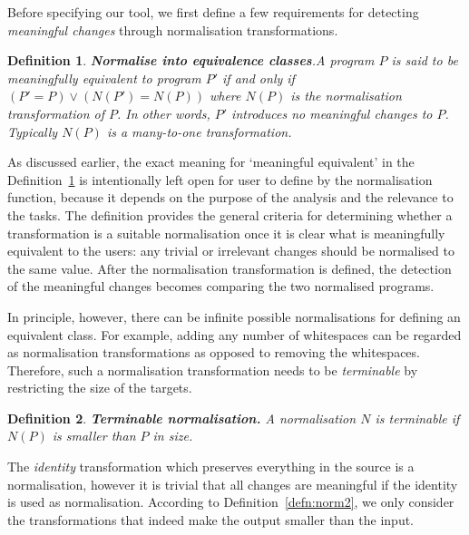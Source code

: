 \documentclass[10pt, conference, compsocconf]{IEEEtran}
\newtheorem{definition}{Definition}
\begin{document}
Before specifying our tool, we first define a few requirements for detecting {\em meaningful changes} through normalisation transformations.
\begin{definition}
{\bf Normalise into equivalence classes}.\label{defn:norm} A program $P$ is said to be {\em meaningfully equivalent} to program $P'$ if and only if $(P'=P) \vee (N(P') = N(P))$ where $N(P)$ is the normalisation transformation of $P$. In other words, $P'$ introduces no meaningful changes to $P$. Typically $N(P)$ is a many-to-one transformation.
\end{definition}

As discussed earlier, the exact meaning for `meaningful equivalent' in  the Definition~\ref{defn:norm} is intentionally left open for user to define by the normalisation function, because it depends on the purpose of the analysis and the relevance to the tasks. The definition provides the general criteria for determining whether a transformation is a suitable normalisation once it is clear what is meaningfully equivalent to the users: any trivial or irrelevant changes should be normalised to the same value. After the normalisation transformation is defined, the detection of the meaningful changes becomes comparing the two normalised programs. 

In principle, however, there can be infinite possible normalisations for defining an equivalent class. For example, adding any number of whitespaces can be regarded as normalisation transformations as opposed to removing the whitespaces. 
Therefore, such a normalisation transformation needs to be {\em terminable} by restricting the size of the targets.
\begin{definition}
{\bf Terminable normalisation.\label{defn:norm2}} A normalisation $N$ is {\em terminable} if $N(P)$ is smaller than $P$ in size.
\end{definition}
The {\em identity} transformation which preserves everything in the source is a normalisation, however it is trivial that all changes are meaningful if the identity is used as normalisation. According to Definition~\ref{defn:norm2}, we only consider the transformations that indeed make the output smaller than the input.
\end{document}
